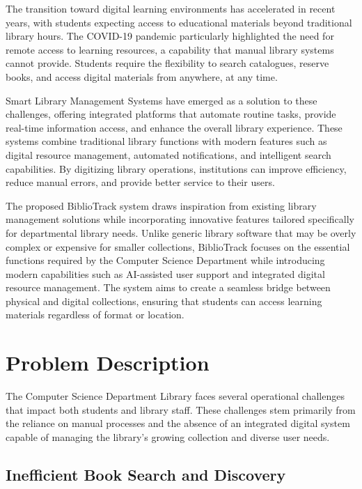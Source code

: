 \documentclass[12pt,a4paper]{report}
\begin{document}
The transition toward digital learning environments has accelerated in recent years, with students expecting access to educational materials beyond traditional library hours. The COVID-19 pandemic particularly highlighted the need for remote access to learning resources, a capability that manual library systems cannot provide. Students require the flexibility to search catalogues, reserve books, and access digital materials from anywhere, at any time.

Smart Library Management Systems have emerged as a solution to these challenges, offering integrated platforms that automate routine tasks, provide real-time information access, and enhance the overall library experience. These systems combine traditional library functions with modern features such as digital resource management, automated notifications, and intelligent search capabilities. By digitizing library operations, institutions can improve efficiency, reduce manual errors, and provide better service to their users.

The proposed BiblioTrack system draws inspiration from existing library management solutions while incorporating innovative features tailored specifically for departmental library needs. Unlike generic library software that may be overly complex or expensive for smaller collections, BiblioTrack focuses on the essential functions required by the Computer Science Department while introducing modern capabilities such as AI-assisted user support and integrated digital resource management. The system aims to create a seamless bridge between physical and digital collections, ensuring that students can access learning materials regardless of format or location.


\section{Problem Description}
\label{sec:problem}

The Computer Science Department Library faces several operational challenges that impact both students and library staff. These challenges stem primarily from the reliance on manual processes and the absence of an integrated digital system capable of managing the library's growing collection and diverse user needs.

\subsection{Inefficient Book Search and Discovery}
\end{document}

